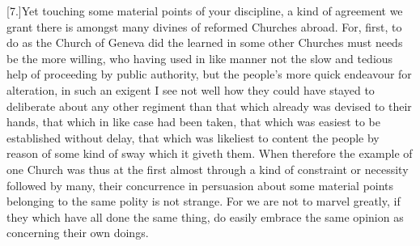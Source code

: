 [7.]Yet touching some material points of your discipline, a kind of agreement we grant there is amongst many divines of reformed Churches abroad. For, first, to do as the Church of Geneva did the learned in some other Churches must needs be the more willing, who having used in like manner not the slow and tedious help of proceeding by public authority, but the people’s more quick endeavour for alteration, in such an exigent I see not well how they could have stayed to deliberate about any other regiment than that which already was devised to their hands, that which in like case had been taken, that which was easiest to be established without delay, that which was likeliest to content the people by reason of some kind of sway which it giveth them. When therefore the example of one Church was thus at the first almost through a kind of constraint or necessity followed by many, their concurrence in persuasion about some material points belonging to the same polity is not strange. For we are not to marvel greatly, if they which have all done the same thing, do easily embrace the same opinion as concerning their own doings.

